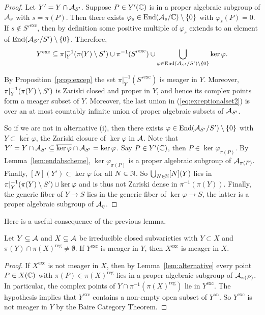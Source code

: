 \documentclass[12pt,oneside]{amsart}
\begin{document}
\begin{proof}
 Let  $Y' = Y\cap \mathcal{A}_{S'}$.
  Suppose $P\in Y'({\mathbb{C}})$ is in a proper algebraic subgroup of $\mathcal{A}_{s}$
  with $s=\pi(P)$. Then there exists $\varphi_s\in
  \mathrm{End}(\mathcal{A}_s/{\mathbb{C}})\setminus\{0\}$ with $\varphi_s(P)=0$. If $s\not\in
  {S'}^{\mathrm{exc}}$, then by definition some positive multiple of
  $\varphi_s$ extends to an element of $\mathrm{End}(\mathcal{A}_{S'}/S')\setminus\{0\}$.  
  Therefore,
  \begin{equation}
    \label{eq:exceptionalset2}
    Y^{\mathrm{exc}}\subseteq \pi|_Y^{-1}(\pi(Y)\setminus S')\cup \pi^{-1}({S'}^{\mathrm{exc}}) \cup \bigcup_{\varphi\in
      \mathrm{End}(\mathcal{A}_{S'}/S')\setminus\{0\}}
    \mathrm{ker}\,\varphi.
  \end{equation}

  By Proposition~\ref{prop:excep} the set
  $\pi|_Y^{-1}({S'}^{\mathrm{exc}})$
  is meager in $Y$. Moreover, $\pi|_Y^{-1}(\pi(Y)\setminus S')$ is Zariski
  closed and proper in $Y$, and hence its complex points form a meager subset of $Y$.
  Moreover, the last union in 
  (\ref{eq:exceptionalset2}) is over an at most
  countably infinite union of proper algebraic subsets of $\mathcal{A}_{S'}$.
  
  So if we are not in alternative (i), then there exists $\varphi\in
  \mathrm{End}(\mathcal{A}_{S'}/S')\setminus\{0\}$ with $Y\subset
  \overline{\ker\varphi}$,  the Zariski closure of $\ker\varphi$ in $\mathcal{A}$.
  Note that $Y' = Y\cap \mathcal{A}_{S'} \subseteq \overline{\ker\varphi}\cap
  \mathcal{A}_{S'} = \ker\varphi$. 
  Say $P\in Y'({\mathbb{C}})$, then $P\in \ker\varphi_{\pi(P)}$.
  By Lemma~\ref{lem:endabscheme}, $\ker\varphi_{\pi(P)}$ is a proper
  algebraic subgroup of $\mathcal{A}_{\pi(P)}$. Finally, $[N](Y')\subset\ker\varphi$ for
  all $N\in{\mathbb{N}}$. So $\bigcup_{N\in{\mathbb{N}}} [N](Y)$
  lies in $\pi|_Y^{-1}(\pi(Y)\setminus S')\cup \ker\varphi$ and is thus not
  Zariski dense in $\pi^{-1}(\pi(Y))$. 
  Finally, the generic fiber of $Y\rightarrow S$ lies in the generic
  fiber of $\ker\varphi\rightarrow S$, the latter is a proper
  algebraic subgroup of $\mathcal{A}_\eta$. 
\end{proof}

Here is a useful consequence of the previous lemma. 

\begin{lemma}
  \label{lem:meagersuperset}
  Let $Y\subseteq \mathcal{A}$ and $X\subseteq \mathcal{A}$ be irreducible closed
  subvarieties with $Y\subset X$ and
  $\pi(Y)\cap\pi(X)^{\mathrm{reg}}\not=\emptyset$.
  If $Y^{\mathrm{exc}}$ is meager in $Y$, then
  $X^{\mathrm{exc}}$ is meager in $X$. 
\end{lemma}
\begin{proof}
  If $X^{\mathrm{exc}}$ is not meager in $X$, then by
  Lemma~\ref{lem:alternative} every point $P\in X({\mathbb{C}})$ with $\pi(P)\in
  \pi(X)^{\mathrm{reg}}$  lies in a proper algebraic subgroup of
  $\mathcal{A}_{\pi(P)}$. In particular, the complex points of $Y \cap
  \pi^{-1}(\pi(X)^{\mathrm{reg}})$ lie in  $Y^{\mathrm{exc}}$.
  The hypothesis implies that $Y^{\mathrm{exc}}$ contains a non-empty open subset
  of $Y^{\mathrm{an}}$. So 
  $Y^{\mathrm{exc}}$ is not meager in $Y$
  by   the Baire Category Theorem.
\end{proof}
\end{document}
